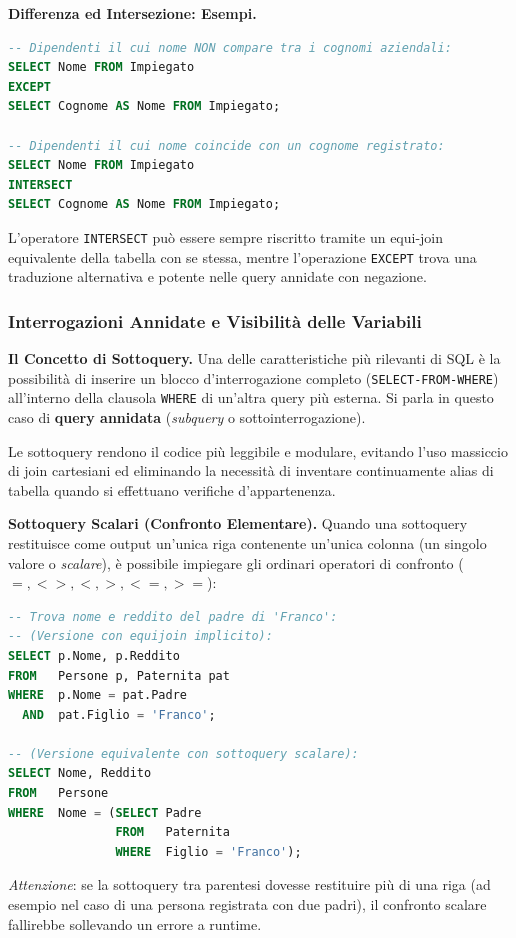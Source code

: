 \documentclass[12pt]{extarticle}
\begin{document}
\medskip
\noindent \textbf{Differenza ed Intersezione: Esempi.}
\begin{lstlisting}[language=SQL]
-- Dipendenti il cui nome NON compare tra i cognomi aziendali:
SELECT Nome FROM Impiegato
EXCEPT
SELECT Cognome AS Nome FROM Impiegato;

-- Dipendenti il cui nome coincide con un cognome registrato:
SELECT Nome FROM Impiegato
INTERSECT
SELECT Cognome AS Nome FROM Impiegato;
\end{lstlisting}
L'operatore \texttt{INTERSECT} può essere sempre riscritto tramite un equi-join equivalente della tabella con se stessa, mentre l'operazione \texttt{EXCEPT} trova una traduzione alternativa e potente nelle query annidate con negazione.

\subsubsection{Interrogazioni Annidate e Visibilità delle Variabili}
\noindent \textbf{Il Concetto di Sottoquery.} Una delle caratteristiche più rilevanti di SQL è la possibilità di inserire un blocco d'interrogazione completo (\texttt{SELECT-FROM-WHERE}) all'interno della clausola \texttt{WHERE} di un'altra query più esterna. Si parla in questo caso di \textbf{query annidata} (\textit{subquery} o sottointerrogazione).

\medskip
\noindent Le sottoquery rendono il codice più leggibile e modulare, evitando l'uso massiccio di join cartesiani ed eliminando la necessità di inventare continuamente alias di tabella quando si effettuano verifiche d'appartenenza.

\medskip
\noindent \textbf{Sottoquery Scalari (Confronto Elementare).} Quando una sottoquery restituisce come output un'unica riga contenente un'unica colonna (un singolo valore o \textit{scalare}), è possibile impiegare gli ordinari operatori di confronto ($=, <>, <, >, <=, >=$):

\begin{lstlisting}[language=SQL]
-- Trova nome e reddito del padre di 'Franco':
-- (Versione con equijoin implicito):
SELECT p.Nome, p.Reddito
FROM   Persone p, Paternita pat
WHERE  p.Nome = pat.Padre
  AND  pat.Figlio = 'Franco';

-- (Versione equivalente con sottoquery scalare):
SELECT Nome, Reddito
FROM   Persone
WHERE  Nome = (SELECT Padre
               FROM   Paternita
               WHERE  Figlio = 'Franco');
\end{lstlisting}
\textit{Attenzione}: se la sottoquery tra parentesi dovesse restituire più di una riga (ad esempio nel caso di una persona registrata con due padri), il confronto scalare fallirebbe sollevando un errore a runtime.
\end{document}
